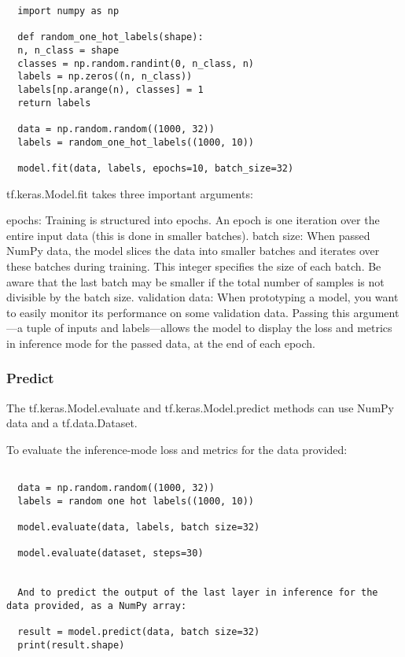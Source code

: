 \begin{verbatim}
  import numpy as np

  def random_one_hot_labels(shape):
  n, n_class = shape
  classes = np.random.randint(0, n_class, n)
  labels = np.zeros((n, n_class))
  labels[np.arange(n), classes] = 1
  return labels

  data = np.random.random((1000, 32))
  labels = random_one_hot_labels((1000, 10))

  model.fit(data, labels, epochs=10, batch_size=32)

\end{verbatim}

tf.keras.Model.fit takes three important arguments:

epochs: Training is structured into epochs. An epoch is one iteration over the entire input data (this is done in smaller batches).
batch size: When passed NumPy data, the model slices the data into smaller batches and iterates over these batches during training. This integer specifies the size of each batch. Be aware that the last batch may be smaller if the total number of samples is not divisible by the batch size.
validation data: When prototyping a model, you want to easily monitor its performance on some validation data. Passing this argument—a tuple of inputs and labels—allows the model to display the loss and metrics in inference mode for the passed data, at the end of each epoch.

\subsubsection{Predict}
The tf.keras.Model.evaluate and tf.keras.Model.predict methods can use NumPy data and a tf.data.Dataset.

To evaluate the inference-mode loss and metrics for the data provided:
\begin{verbatim}

  data = np.random.random((1000, 32))
  labels = random one hot labels((1000, 10))

  model.evaluate(data, labels, batch size=32)

  model.evaluate(dataset, steps=30)


  And to predict the output of the last layer in inference for the data provided, as a NumPy array:

  result = model.predict(data, batch size=32)
  print(result.shape)
\end{verbatim}

